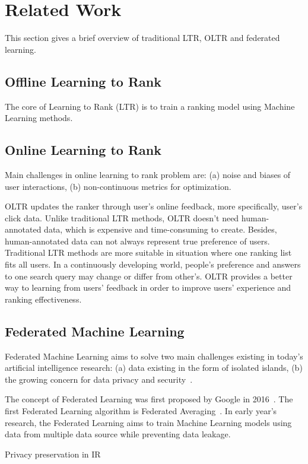 \section{Related Work}

This section gives a brief overview of traditional LTR, OLTR and federated learning. 

\subsection{Offline Learning to Rank}
The core of Learning to Rank (LTR) is to train a ranking model using Machine Learning methods.

\subsection{Online Learning to Rank}
Main challenges in online learning to rank problem are: (a) noise and biases of user interactions, (b) non-continuous metrics for optimization.

OLTR updates the ranker through user's online feedback, more specifically, user's click data. Unlike traditional LTR methods, OLTR doesn't need human-annotated data, which is expensive and time-consuming to create. Besides, human-annotated data can not always represent true preference of users. Traditional LTR methods are more suitable in situation where one ranking list fits all users. In a continuously developing world, people's preference and answers to one search query may change or differ from other's. OLTR provides a better way to learning from users' feedback in order to improve users' experience and ranking effectiveness.

\subsection{Federated Machine Learning}

Federated Machine Learning aims to solve two main challenges existing in today's artificial intelligence research: (a) data existing in the form of isolated islands, (b) the growing concern for data privacy and security~\cite{yang2019federated}. 

The concept of Federated Learning was first proposed by Google in 2016~\cite{DBLP:journals/corr/KonecnyMRR16,DBLP:journals/corr/KonecnyMYRSB16}. The first Federated Learning algorithm is Federated Averaging~\cite{mcmahan2016federated}. In early year's research, the Federated Learning aims to train Machine Learning models using data from multiple data source while preventing data leakage. 



Privacy preservation in IR~\cite{yang2016privacy,yang2017differential,cooper2008survey,korolova2009releasing,zhang2016anonymizing}